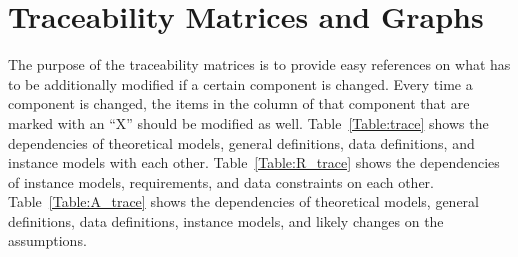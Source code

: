 \documentclass[12pt]{article}
\begin{document}
\section{Traceability Matrices and Graphs}
The purpose of the traceability matrices is to provide easy references on what has to be additionally modified if a certain component is changed.  Every time a 
component is changed, the items in the column of that component that are 
marked with an ``X'' should be modified as well.  Table~\ref{Table:trace}
shows the dependencies of theoretical models, general definitions, data
definitions, and instance models with each other. Table~\ref{Table:R_trace} shows
the dependencies of instance models, requirements, and data constraints on each other. Table~\ref{Table:A_trace} shows the dependencies of theoretical models, general definitions, data definitions,  instance models, and likely changes on the assumptions.
\end{document}
